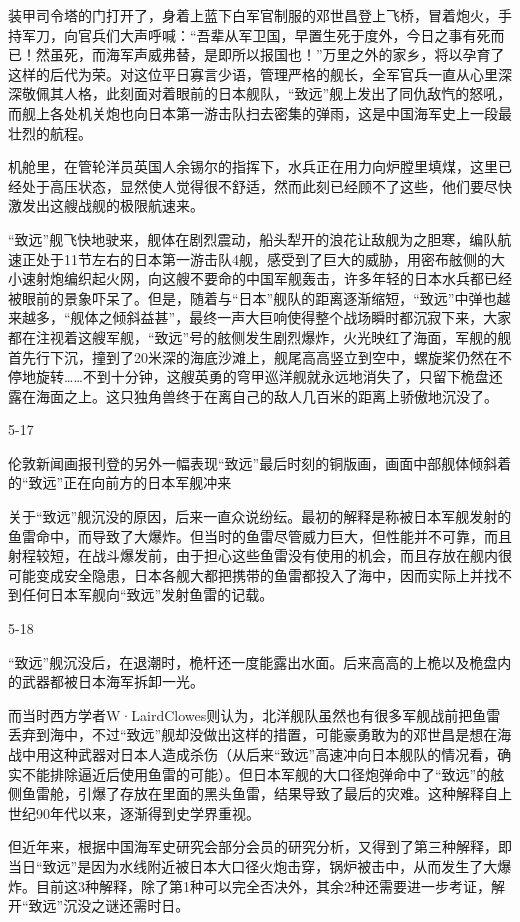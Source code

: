 \documentclass[12pt,UTF8]{ctexbook}
\begin{document}
装甲司令塔的门打开了，身着上蓝下白军官制服的邓世昌登上飞桥，冒着炮火，手持军刀，向官兵们大声呼喊：“吾辈从军卫国，早置生死于度外，今日之事有死而已！然虽死，而海军声威弗替，是即所以报国也！”万里之外的家乡，将以孕育了这样的后代为荣。对这位平日寡言少语，管理严格的舰长，全军官兵一直从心里深深敬佩其人格，此刻面对着眼前的日本舰队，“致远”舰上发出了同仇敌忾的怒吼，而舰上各处机关炮也向日本第一游击队扫去密集的弹雨，这是中国海军史上一段最壮烈的航程。

机舱里，在管轮洋员英国人余锡尔的指挥下，水兵正在用力向炉膛里填煤，这里已经处于高压状态，显然使人觉得很不舒适，然而此刻已经顾不了这些，他们要尽快激发出这艘战舰的极限航速来。

“致远”舰飞快地驶来，舰体在剧烈震动，船头犁开的浪花让敌舰为之胆寒，编队航速正处于11节左右的日本第一游击队4舰，感受到了巨大的威胁，用密布舷侧的大小速射炮编织起火网，向这艘不要命的中国军舰轰击，许多年轻的日本水兵都已经被眼前的景象吓呆了。但是，随着与“日本”舰队的距离逐渐缩短，“致远”中弹也越来越多，“舰体之倾斜益甚”，最终一声大巨响使得整个战场瞬时都沉寂下来，大家都在注视着这艘军舰，“致远”号的舷侧发生剧烈爆炸，火光映红了海面，军舰的舰首先行下沉，撞到了20米深的海底沙滩上，舰尾高高竖立到空中，螺旋桨仍然在不停地旋转……不到十分钟，这艘英勇的穹甲巡洋舰就永远地消失了，只留下桅盘还露在海面之上。这只独角兽终于在离自己的敌人几百米的距离上骄傲地沉没了。

5-17

伦敦新闻画报刊登的另外一幅表现“致远”最后时刻的铜版画，画面中部舰体倾斜着的“致远”正在向前方的日本军舰冲来

关于“致远”舰沉没的原因，后来一直众说纷纭。最初的解释是称被日本军舰发射的鱼雷命中，而导致了大爆炸。但当时的鱼雷尽管威力巨大，但性能并不可靠，而且射程较短，在战斗爆发前，由于担心这些鱼雷没有使用的机会，而且存放在舰内很可能变成安全隐患，日本各舰大都把携带的鱼雷都投入了海中，因而实际上并找不到任何日本军舰向“致远”发射鱼雷的记载。

5-18

“致远”舰沉没后，在退潮时，桅杆还一度能露出水面。后来高高的上桅以及桅盘内的武器都被日本海军拆卸一光。

而当时西方学者W·LairdClowes则认为，北洋舰队虽然也有很多军舰战前把鱼雷丢弃到海中，不过“致远”舰却没做出这样的措置，可能豪勇敢为的邓世昌是想在海战中用这种武器对日本人造成杀伤（从后来“致远”高速冲向日本舰队的情况看，确实不能排除逼近后使用鱼雷的可能）。但日本军舰的大口径炮弹命中了“致远”的舷侧鱼雷舱，引爆了存放在里面的黑头鱼雷，结果导致了最后的灾难。这种解释自上世纪90年代以来，逐渐得到史学界重视。

但近年来，根据中国海军史研究会部分会员的研究分析，又得到了第三种解释，即当日“致远”是因为水线附近被日本大口径火炮击穿，锅炉被击中，从而发生了大爆炸。目前这3种解释，除了第1种可以完全否决外，其余2种还需要进一步考证，解开“致远”沉没之谜还需时日。
\end{document}
